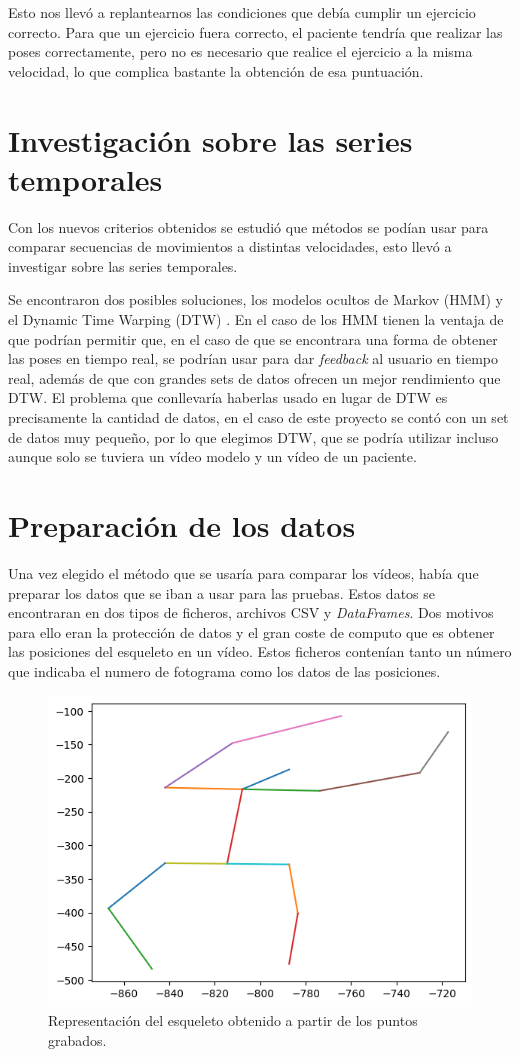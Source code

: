 Esto nos llevó a replantearnos las condiciones que debía cumplir un ejercicio correcto. Para que un ejercicio fuera correcto, el paciente tendría que realizar las poses correctamente, pero no es necesario que realice el ejercicio a la misma velocidad, lo que complica bastante la obtención de esa puntuación. 

\section{Investigación sobre las series temporales}
Con los nuevos criterios obtenidos se estudió que métodos se podían usar para comparar secuencias de movimientos a distintas velocidades, esto llevó a investigar sobre las series temporales.

Se encontraron dos posibles soluciones, los modelos ocultos de Markov (HMM) y el Dynamic Time Warping (DTW) \cite{dtwandhmm}. En el caso de los HMM tienen la ventaja de que podrían permitir que, en el caso de que se encontrara una forma de obtener las poses en tiempo real, se podrían usar para dar \textit{feedback} al usuario en tiempo real, además de que con grandes sets de datos ofrecen un mejor rendimiento que DTW. El problema que conllevaría haberlas usado en lugar de DTW es precisamente la cantidad de datos, en el caso de este proyecto se contó con un set de datos muy pequeño, por lo que elegimos DTW, que se podría utilizar incluso aunque solo se tuviera un vídeo modelo y un vídeo de un paciente. 

\section{Preparación de los datos}
Una vez elegido el método que se usaría para comparar los vídeos, había que preparar los datos que se iban a usar para las pruebas. Estos datos se encontraran en dos tipos de ficheros, archivos CSV y \textit{DataFrames}. Dos motivos para ello eran la protección de datos y el gran coste de computo que es obtener las posiciones del esqueleto en un vídeo. Estos ficheros contenían tanto un número que indicaba el numero de fotograma como los datos de las posiciones.

\begin{figure}
	\centering
	\includegraphics[width=0.7\linewidth]{img/esqueleto}
	\caption{Representación del esqueleto obtenido a partir de los puntos grabados.}
	\label{fig:esqueleto}
\end{figure}

